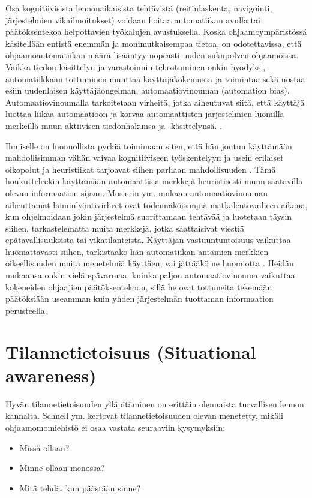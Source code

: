 \documentclass[utf8,bachelor,manualbib]{gradu3}
\begin{document}
Osa kognitiivisista lennonaikaisista tehtävistä (reitinlaskenta, navigointi, järjestelmien vikailmoitukset) voidaan hoitaa automatiikan avulla tai päätöksentekoa helpottavien työkalujen avustuksella. Koska ohjaamoympäristössä käsitellään entistä enemmän ja monimutkaisempaa tietoa, on odotettavissa, että ohjaamoautomatiikan määrä lisääntyy nopeasti uuden sukupolven ohjaamoissa. Vaikka tiedon käsittelyn ja varastoinnin tehostuminen onkin hyödyksi, automatiikkaan tottuminen muuttaa käyttäjäkokemusta ja toimintaa sekä nostaa esiin uudenlaisen käyttäjäongelman, automaatiovinouman (automation bias). Automaatiovinoumalla tarkoitetaan virheitä, jotka aiheutuvat siitä, että käyttäjä luottaa liikaa automaatioon ja korvaa automaattisten järjestelmien luomilla merkeillä muun aktiivisen tiedonhakunsa ja -käsittelynsä. \citep{mosierym1998}.

Ihmiselle on luonnollista pyrkiä toimimaan siten, että hän joutuu käyttämään mahdollisimman vähän vaivaa kognitiiviseen työskentelyyn ja usein erilaiset oikopolut ja heuristiikat tarjoavat siihen parhaan mahdollisuuden \citep{fisketaylor1994}. Tämä houkutteleekin käyttämään automaattisia merkkejä heuristisesti muun saatavilla olevan informaation sijaan. Mosierin ym. \citeyearpar{mosierym1994} mukaan automaatiovinouman aiheuttamat laiminlyöntivirheet ovat todennäköisimpiä matkalentovaiheen aikana, kun ohjelmoidaan jokin järjestelmä suorittamaan tehtävää ja luotetaan täysin siihen, tarkastelematta muita merkkejä, jotka saattaisivat viestiä epätavallisuuksista tai vikatilanteista. Käyttäjän vastuuntuntoisuus vaikuttaa huomattavasti siihen, tarkistaako hän automatiikan antamien merkkien oikeellisuuden muita menetelmiä käyttäen, vai jättääkö ne huomiotta \citep{mosierym1998}. Heidän mukaansa onkin vielä epävarmaa, kuinka paljon automaatiovinouma vaikuttaa kokeneiden ohjaajien päätöksentekoon, sillä he ovat tottuneita tekemään päätöksiään useamman kuin yhden järjestelmän tuottaman informaation perusteella.

\section{Tilannetietoisuus (Situational awareness)}

Hyvän tilannetietoisuuden ylläpitäminen on erittäin olennaista turvallisen lennon kannalta. Schnell ym. \citeyearpar{schnellym2004} kertovat tilannetietoisuuden olevan menetetty, mikäli ohjaamomomiehistö ei osaa vastata seuraaviin kysymyksiin:

\begin{itemize}
\item Missä ollaan?
\item Minne ollaan menossa?
\item Mitä tehdä, kun päästään sinne?
\end{itemize}
\end{document}

